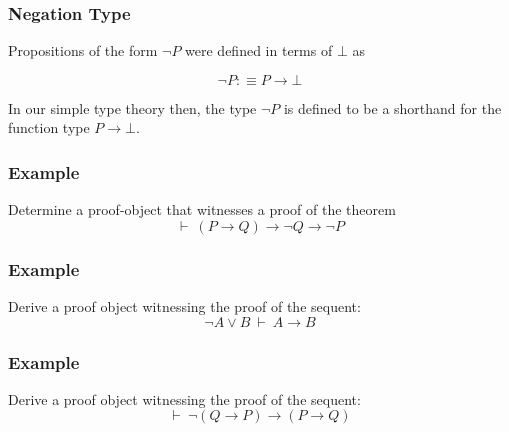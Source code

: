 \documentclass{beamer}
\theoremstyle{indentDefn} \newtheorem{defn}[]{Definition}
\begin{document}
\begin{frame}
  \frametitle{Negation Type}

  Propositions of the form $\lnot P$ were defined in terms of $\bot$ as 

  $$\lnot P :\equiv P \to \bot$$

  In our simple type theory then, the type $\lnot P$ is defined to be a shorthand for the function type $P \to \bot$.  

  \vspace{4cm}

\end{frame}

\begin{frame}
  \frametitle{Example}

  Determine a proof-object that witnesses a proof of the theorem
  $$ \vdash \ (P \to Q) \to \lnot Q \to \lnot P$$

  \vspace{6cm}

\end{frame}

\begin{frame}
  \frametitle{Example}

  Derive a proof object witnessing the proof of the sequent: 
  $$ \lnot A \lor B \ \vdash \ A \to B$$

  \vspace{5cm}

\end{frame}

\begin{frame}
  \frametitle{Example}

  Derive a proof object witnessing the proof of the sequent: 
  $$ \vdash \ \lnot(Q \to P) \to (P \to Q)$$

  \vspace{5cm}

\end{frame}
\end{document}
